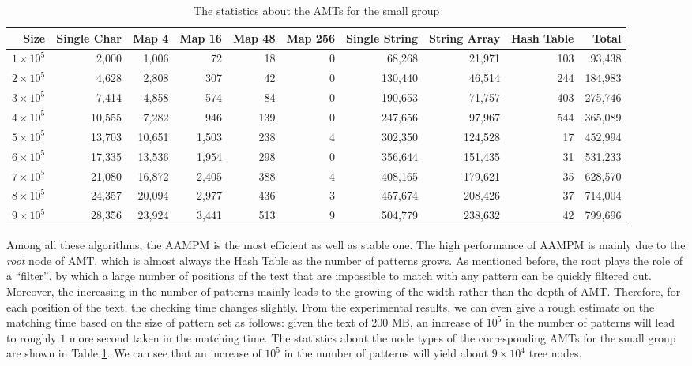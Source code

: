 \documentclass{article}
\begin{document}

\begin{table}[!htp]
  \scriptsize
  \caption{The statistics about the AMTs for the small group}
  \label{tab:small}
  \begin{tabular}{rrrrrrrrrr}
 \hline
 Size &
 Single Char &
 Map 4 &
 Map 16 &
 Map 48 &
 Map 256 &
 Single String &
 String Array   &
 Hash Table &
 Total\\
\hline
$1 \times 10^5$  &  2,000 &  1,006 &    72 &  18 & 0 &  68,268 &  21,971 & 103 &  93,438 \\
$2 \times 10^5$ &  4,628 &  2,808 &   307 &  42 & 0 & 130,440 &  46,514 & 244 & 184,983 \\
$3 \times 10^5$ &  7,414 &  4,858 &   574 &  84 & 0 & 190,653 &  71,757 & 403 & 275,746 \\
$4 \times 10^5$ & 10,555 &  7,282 &   946 & 139 & 0 & 247,656 &  97,967 & 544 & 365,089 \\
$5 \times 10^5$ & 13,703 & 10,651 & 1,503 & 238 & 4 & 302,350 & 124,528 &  17 & 452,994 \\
$6 \times 10^5$ & 17,335 & 13,536 & 1,954 & 298 & 0 & 356,644 & 151,435 &  31 & 531,233 \\
$7 \times 10^5$ & 21,080 & 16,872 & 2,405 & 388 & 4 & 408,165 & 179,621 &  35 & 628,570 \\
$8 \times 10^5$ & 24,357 & 20,094 & 2,977 & 436 & 3 & 457,674 & 208,426 &  37 & 714,004 \\
$9 \times 10^5$ & 28,356 & 23,924 & 3,441 & 513 & 9 & 504,779 & 238,632 &  42 & 799,696 \\
\hline
  \end{tabular}
\end{table}

Among all these algorithms, the \textsf{AAMPM} is the most efficient
as well as stable one. The high performance of \textsf{AAMPM} is
mainly due to the \emph{root} node of AMT, which is almost always the
Hash Table as the number of patterns grows. As mentioned before, the
root plays the role of a ``filter'', by which a large number of
positions of the text that are impossible to match with any pattern
can be quickly filtered out. Moreover, the increasing in the number of
patterns mainly leads to the growing of the width rather than the
depth of AMT. Therefore, for each position of the text, the checking
time changes slightly. From the experimental results, we can even give
a rough estimate on the matching time based on the size of pattern set
as follows: given the text of 200 MB, an increase of $10^5$ in the
number of patterns will lead to roughly $1$ more second taken in the
matching time. The statistics about the node types of the
corresponding AMTs for the small group are shown in Table
\ref{tab:small}. We can see that an increase of $10^5$ in the number
of patterns will yield about $9 \times 10^4$ tree nodes.
\end{document}
